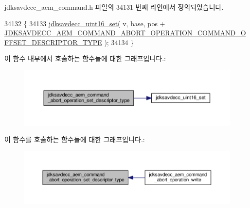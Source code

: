 jdksavdecc\+\_\+aem\+\_\+command.\+h 파일의 34131 번째 라인에서 정의되었습니다.


\begin{DoxyCode}
34132 \{
34133     \hyperlink{group__endian_ga14b9eeadc05f94334096c127c955a60b}{jdksavdecc\_uint16\_set}( v, base, pos + 
      \hyperlink{group__command__abort__operation_gaacbbfc953508d4736f3684c42bee7b64}{JDKSAVDECC\_AEM\_COMMAND\_ABORT\_OPERATION\_COMMAND\_OFFSET\_DESCRIPTOR\_TYPE}
       );
34134 \}
\end{DoxyCode}


이 함수 내부에서 호출하는 함수들에 대한 그래프입니다.\+:
\nopagebreak
\begin{figure}[H]
\begin{center}
\leavevmode
\includegraphics[width=350pt]{group__command__abort__operation_ga25de2bd6c128f678dafb1f338a7a7b2e_cgraph}
\end{center}
\end{figure}




이 함수를 호출하는 함수들에 대한 그래프입니다.\+:
\nopagebreak
\begin{figure}[H]
\begin{center}
\leavevmode
\includegraphics[width=350pt]{group__command__abort__operation_ga25de2bd6c128f678dafb1f338a7a7b2e_icgraph}
\end{center}
\end{figure}


